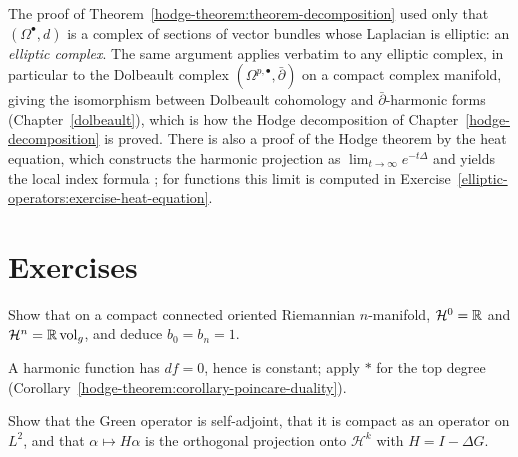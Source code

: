 \begin{remark}\label{hodge-theorem:remark-elliptic-complexes}
The proof of Theorem~\ref{hodge-theorem:theorem-decomposition} used only that $(\Omega^\bullet, d)$ is a complex of sections of vector bundles whose Laplacian is elliptic: an \emph{elliptic complex}. The same
argument applies verbatim to any elliptic complex, in particular to the Dolbeault complex $(\Omega^{p,\bullet}, \bar\partial)$ on a compact complex manifold, giving the isomorphism between Dolbeault
cohomology and $\bar\partial$-harmonic forms (Chapter~\ref{dolbeault}), which is how the Hodge decomposition of Chapter~\ref{hodge-decomposition} is proved. There is also a proof of the Hodge theorem by the
heat equation, which constructs the harmonic projection as $\lim_{t \to \infty}e^{-t\Delta}$ and yields the local index formula \cite{lawson-michelsohn}; for functions this limit is computed in
Exercise~\ref{elliptic-operators:exercise-heat-equation}.
\end{remark}

\section{Exercises}\label{hodge-theorem:section-exercises}

\begin{exercise}\label{hodge-theorem:exercise-harmonic-top}
Show that on a compact connected oriented Riemannian $n$-manifold, $\mathcal{H}^0 = \mathbb{R}$ and $\mathcal{H}^n = \mathbb{R}\,\mathrm{vol}_g$, and deduce $b_0 = b_n = 1$.
\end{exercise}

\begin{solution}
A harmonic function has $df = 0$, hence is constant; apply $*$ for the top degree (Corollary~\ref{hodge-theorem:corollary-poincare-duality}).
\end{solution}

\begin{exercise}\label{hodge-theorem:exercise-green-properties}
Show that the Green operator is self-adjoint, that it is compact as an operator on $L^2$, and that $\alpha \mapsto H\alpha$ is the orthogonal projection onto $\mathcal{H}^k$ with $H = I - \Delta G$.
\end{exercise}

